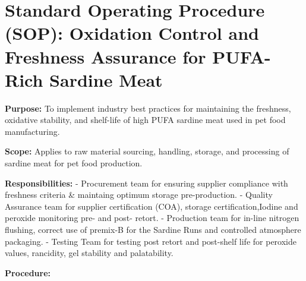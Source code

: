 \section*{Standard Operating Procedure (SOP): Oxidation Control and Freshness Assurance for PUFA-Rich Sardine Meat}

\textbf{Purpose:}  
To implement industry best practices for maintaining the freshness, oxidative stability, and shelf-life of high PUFA sardine meat used in pet food manufacturing.

\textbf{Scope:}  
Applies to raw material sourcing, handling, storage, and processing of sardine meat for pet food production.

\textbf{Responsibilities:}  
- Procurement team for ensuring supplier compliance with freshness criteria & maintaing optimum storage pre-production.
- Quality Assurance team for supplier certification (COA), storage certification,Iodine and peroxide monitoring pre- and post- retort.   
- Production team for in-line nitrogen flushing, correct use of premix-B for the Sardine Runs and controlled atmosphere packaging.  
- Testing Team for testing post retort and post-shelf life for peroxide values, rancidity, gel stability and palatability.  

\textbf{Procedure:}

